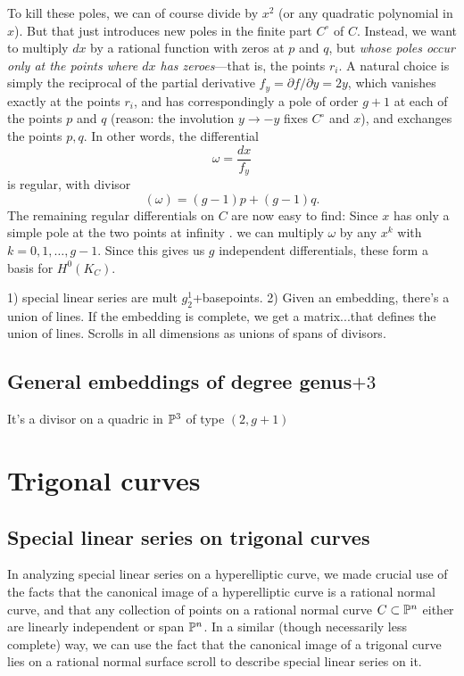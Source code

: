 To kill these poles, we can of course divide by $x^2$ (or any quadratic polynomial in $x$). But that just introduces new poles in the finite part $C^\circ$ of $C$. Instead, we want to multiply $dx$ by a rational function with zeros at $p$ and $q$, but \emph{whose poles occur only at the points where $dx$ has zeroes}---that is, the points $r_i$.  A natural choice is simply the reciprocal of the partial derivative $f_y = \partial f/ \partial y = 2y$, which vanishes exactly at the points $r_i$, and has correspondingly a pole of order $g+1$ at each of the points $p$ and $q$ (reason: the involution $y\to -y$ fixes $C^\circ$ and $x$), and exchanges the points $p,q$. In other words, the differential
$$
\omega = \frac{dx}{f_y}
$$
is regular, with divisor
$$
(\omega) = (g-1)p + (g-1)q.
$$
The remaining regular differentials on $C$ are now easy to find: Since $x$ has only a simple pole
at the two points at infinity . we can  multiply $\omega$ by any $x^k$ with $k = 0, 1, \dots, g-1$. Since this gives us $g$ independent differentials, these  form a basis for $H^0(K_C)$.


 1) special linear series are mult $g^1_2$+basepoints. 2) Given an embedding, there's a union of lines. If the embedding is complete, we get a matrix...that defines the union of lines. Scrolls in all dimensions as unions of spans of divisors.
 
 
\subsection{General embeddings of degree
genus$+3$} 

It's a divisor on a quadric in $\PP^{3}$ of type $(2,g+1)$


\section{Trigonal curves}

\subsection{Special linear series on trigonal curves}

In analyzing special linear series on a hyperelliptic curve, we made crucial use of the facts that the canonical image of a hyperelliptic curve is a rational normal curve, and that any collection of points on a rational normal curve $C \subset \PP^n$ either are linearly independent or span $\PP^n$. In a similar (though necessarily less complete) way, we can use the fact that the canonical image of a trigonal curve lies on a rational normal surface scroll to describe special linear series on it.

